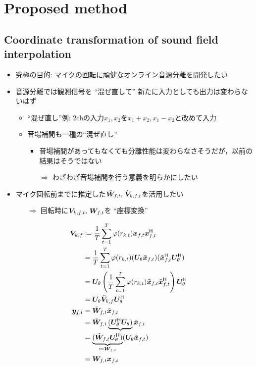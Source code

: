 \documentclass[sip,biber]{now-journal}
\begin{document}
\section{Proposed method}\label{sec:proposed}
\subsection{Coordinate transformation of sound field interpolation}
\begin{itemize}
  \item 究極の目的: マイクの回転に頑健なオンライン音源分離を開発したい
  \item 音源分離では観測信号を ``混ぜ直して'' 新たに入力としても出力は変わらないはず
    \begin{itemize}
      \item ``混ぜ直し''例: 2chの入力$x_1, x_2$を$x_1+x_2, x_1-x_2$と改めて入力
      \item 音場補間も一種の``混ぜ直し''
        \begin{itemize}
          \item 音場補間があってもなくても分離性能は変わらなさそうだが，以前の結果はそうではない
          \item[$\Rightarrow$] わざわざ音場補間を行う意義を明らかにしたい
        \end{itemize}
    \end{itemize}
  \item マイク回転前までに推定した$\irot{\Demix} _{\ft},\, \irot{\cov} _{\src,\ft}$を活用したい
    \begin{itemize}
      \item[$\Rightarrow$] 回転時に$\cov _{\src,\ft},\, \Demix _{\ft}$を ``座標変換''
    \end{itemize}
\end{itemize}
\begin{align}
  {\cov} _{\src,\freq} &\coloneqq \frac{1}{\Tframe} \sum _{\tframe = 1} ^{\Tframe} \weight (\var _{\src,\tframe}) \Obs _{\ft} \Obs _{\ft} ^{\hermite} \\
                       &= \frac{1}{\Tframe} \sum _{\tframe = 1} ^{\Tframe} \weight (\var _{\src,\tframe}) (\rotMat _{\rotDeg} \irot{\Obs} _{\ft}) (\irot{\Obs} _{\ft} ^{\hermite} \rotMat _{\rotDeg} ^{\hermite}) \\
                       &= \rotMat _{\rotDeg} \left(\frac{1}{\Tframe} \sum _{\tframe = 1} ^{\Tframe} \weight (\var _{\src,\tframe}) \irot{\Obs} _{\ft} \irot{\Obs} _{\ft} ^{\hermite}\right) \rotMat _{\rotDeg} ^{\hermite} \\
                       &= \rotMat _{\rotDeg} \irot{\cov} _{\src,\freq} \rotMat _{\rotDeg} ^{\hermite}
  \\
  \Est _{\ft} &= \irot{\Demix} _{\ft} \irot{\Obs} _{\ft} \\
              &= \irot{\Demix} _{\ft} \underbrace{(\rotMat _{\rotDeg} ^{\hermite} \rotMat _{\rotDeg})} \irot{\Obs} _{\ft} \\
              &= \underbrace{(\irot{\Demix} _{\ft} \rotMat _{\rotDeg} ^{\hermite})}_{\coloneqq \Demix _{\ft}} (\rotMat _{\rotDeg} \irot{\Obs} _{\ft}) \\
              &= \Demix _{\ft} \Obs _{\ft}
\end{align}
\end{document}
